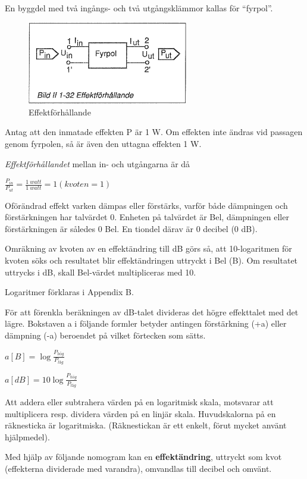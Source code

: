 En byggdel med två ingångs- och två utgångsklämmor kallas för ``fyrpol''.

\begin{figure}[th]
\begin{center}
\includegraphics[width=7cm]{images/bild_2_1-32}
\caption{Effektförhållande}
\label{fig:BildII1-32}
\end{center}
\end{figure}

Antag att den inmatade effekten P är 1 W. Om effekten inte ändras vid passagen
genom fyrpolen, så är även den uttagna effekten 1 W.

\emph{Effektförhållandet} mellan in- och utgångarna är då

\(\frac{P_{in}}{P_{ut}} = \frac{1\ watt}{1\ watt} = 1 (kvoten = 1)\)

Oförändrad effekt varken dämpas eller förstärks, varför både dämpningen och
förstärkningen har talvärdet 0. Enheten på talvärdet är Bel, dämpningen eller
förstärkningen är således 0 Bel. En tiondel därav är 0 decibel (0 dB).

Omräkning av kvoten av en effektändring till dB görs så, att 10-logaritmen för
kvoten söks och resultatet blir effektändringen uttryckt i Bel (B). Om
resultatet uttrycks i dB, skall Bel-värdet multipliceras med 10.

Logaritmer förklaras i Appendix B.

För att förenkla beräkningen av dB-talet divideras det högre effekttalet med det
lägre. Bokstaven a i följande formler betyder antingen förstärkning (+a) eller
dämpning (-a) beroendet på vilket förtecken som sätts.

\(a[B] = \log \frac{P_{hög}}{P_{låg}}\)

\(a[dB] = 10\log \frac{P_{hög}}{P_{låg}}\)

Att addera eller subtrahera värden på en logaritmisk skala, motsvarar att
multiplicera resp. dividera värden på en linjär skala. Huvudskalorna på en
räknesticka är logaritmiska. (Räknestickan är ett enkelt, förut mycket använt
hjälpmedel).

Med hjälp av följande nomogram kan en \textbf{effektändring}, uttryckt som kvot
(effekterna dividerade med varandra), omvandlas till decibel och omvänt.


